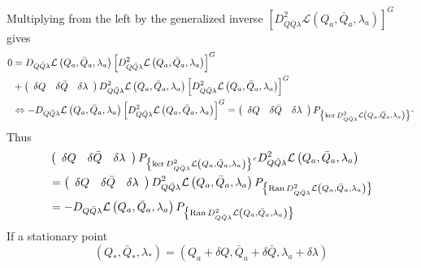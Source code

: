 \documentclass[aps,preprint]{revtex4}%
\begin{document}
Multiplying from the left by the generalized inverse $\left[  D_{Q\bar
{Q}\lambda}^{2}\mathcal{L}\left(  Q_{a},\bar{Q}_{a},\lambda_{a}\right)
\right]  ^{G}$ gives
\begin{align}
0  &  =D_{Q\bar{Q}\lambda}\mathcal{L}\left(  Q_{a},\bar{Q}_{a},\lambda
_{a}\right)  \left[  D_{Q\bar{Q}\lambda}^{2}\mathcal{L}\left(  Q_{a},\bar
{Q}_{a},\lambda_{a}\right)  \right]  ^{G}\\
&  +\left(
\begin{array}
[c]{ccc}%
\delta Q & \delta\bar{Q} & \delta\lambda
\end{array}
\right)  D_{Q\bar{Q}\lambda}^{2}\mathcal{L}\left(  Q_{a},\bar{Q}_{a}%
,\lambda_{a}\right)  \left[  D_{Q\bar{Q}\lambda}^{2}\mathcal{L}\left(
Q_{a},\bar{Q}_{a},\lambda_{a}\right)  \right]  ^{G}\\
&  \Leftrightarrow-D_{Q\bar{Q}\lambda}\mathcal{L}\left(  Q_{a},\bar{Q}%
_{a},\lambda_{a}\right)  \left[  D_{Q\bar{Q}\lambda}^{2}\mathcal{L}\left(
Q_{a},\bar{Q}_{a},\lambda_{a}\right)  \right]  ^{G}=\left(
\begin{array}
[c]{ccc}%
\delta Q & \delta\bar{Q} & \delta\lambda
\end{array}
\right)  P_{\left\{  \ker D_{Q\bar{Q}\lambda}^{2}\mathcal{L}\left(  Q_{a}%
,\bar{Q}_{a},\lambda_{a}\right)  \right\}  ^{c}}%
\end{align}
Thus
\begin{align}
&  \left(
\begin{array}
[c]{ccc}%
\delta Q & \delta\bar{Q} & \delta\lambda
\end{array}
\right)  P_{\left\{  \ker D_{Q\bar{Q}\lambda}^{2}\mathcal{L}\left(  Q_{a}%
,\bar{Q}_{a},\lambda_{a}\right)  \right\}  ^{c}}D_{Q\bar{Q}\lambda}%
^{2}\mathcal{L}\left(  Q_{a},\bar{Q}_{a},\lambda_{a}\right) \\
&  =\left(
\begin{array}
[c]{ccc}%
\delta Q & \delta\bar{Q} & \delta\lambda
\end{array}
\right)  D_{Q\bar{Q}\lambda}^{2}\mathcal{L}\left(  Q_{a},\bar{Q}_{a}%
,\lambda_{a}\right)  P_{\left\{  \operatorname{Ran}D_{Q\bar{Q}\lambda}%
^{2}\mathcal{L}\left(  Q_{a},\bar{Q}_{a},\lambda_{a}\right)  \right\}  }\\
&  =-D_{Q\bar{Q}\lambda}\mathcal{L}\left(  Q_{a},\bar{Q}_{a},\lambda
_{a}\right)  P_{\left\{  \operatorname{Ran}D_{Q\bar{Q}\lambda}^{2}%
\mathcal{L}\left(  Q_{a},\bar{Q}_{a},\lambda_{a}\right)  \right\}  }%
\end{align}
If a stationary point
\begin{equation}
\left(  Q_{\ast},\bar{Q}_{\ast},\lambda_{\ast}\right)  =\left(  Q_{a}+\delta
Q,\bar{Q}_{a}+\delta\bar{Q},\lambda_{a}+\delta\lambda\right)
\end{equation}
\end{document}
